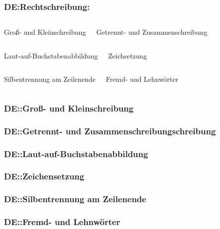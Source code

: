 
\begin{frame}  
  \frametitle{DE:Rechtschreibung:}

  \begin{columns}
      \begin{center}
        Groß- und Kleinschreibung
      \end{center}
      \begin{center}
        Getrennt- und Zusammenschreibung
      \end{center}
  \end{columns}

  \begin{columns}
      \begin{center}
        Laut-auf-Buchstabenabbildung
      \end{center}
      \begin{center}
        Zeichsetzung
      \end{center}
  \end{columns}

  \begin{columns}
      \begin{center}
        Silbentrennung am Zeilenende 
      \end{center}
      \begin{center}
        Fremd- und Lehnwörter
      \end{center}
  \end{columns}
\end{frame}

\begin{frame}  
  \frametitle{DE::Groß- und Kleinschreibung}

\end{frame}

\begin{frame}  
  \frametitle{DE::Getrennt- und Zusammenschreibungschreibung}

\end{frame}

\begin{frame}  
  \frametitle{DE::Laut-auf-Buchstabenabbildung}

\end{frame}

\begin{frame}  
  \frametitle{DE::Zeichensetzung}

\end{frame}

\begin{frame}  
  \frametitle{DE::Silbentrennung am Zeilenende}

\end{frame}

\begin{frame}  
  \frametitle{DE::Fremd- und Lehnwörter}

\end{frame}


